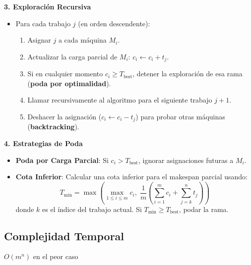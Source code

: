 \documentclass{report}
\begin{document}
		\textbf{3. Exploración Recursiva}
		\begin{itemize}
			\item Para cada trabajo \( j \) (en orden descendente):
			\begin{enumerate}
				\item Asignar \( j \) a cada máquina \( M_i \).
				\item Actualizar la carga parcial de \( M_i \): \( c_i \leftarrow c_i + t_j \).
				\item Si en cualquier momento \( c_i \geq T_{\text{best}} \), detener la exploración de esa rama (\textbf{poda por optimalidad}).
				\item Llamar recursivamente al algoritmo para el siguiente trabajo \( j+1 \).
				\item Deshacer la asignación (\( c_i \leftarrow c_i - t_j \)) para probar otras máquinas (\textbf{backtracking}).
			\end{enumerate}
		\end{itemize}

		\textbf{4. Estrategias de Poda}
		\begin{itemize}
			\item \textbf{Poda por Carga Parcial}: Si \( c_i > T_{\text{best}} \), ignorar asignaciones futuras a \( M_i \).
			\item \textbf{Cota Inferior}: Calcular una cota inferior para el makespan parcial usando:
			\[
			T_{\text{min}} = \max\left( \max_{1 \leq i \leq m} c_i,\; \frac{1}{m} \left( \sum_{i=1}^m c_i + \sum_{j=k}^n t_j \right) \right)
			\]
			donde \( k \) es el índice del trabajo actual. Si \( T_{\text{min}} \geq T_{\text{best}} \), podar la rama.
		\end{itemize}

		\subsection*{Complejidad Temporal}
		$O(m^n)$ en el peor caso
\end{document}
